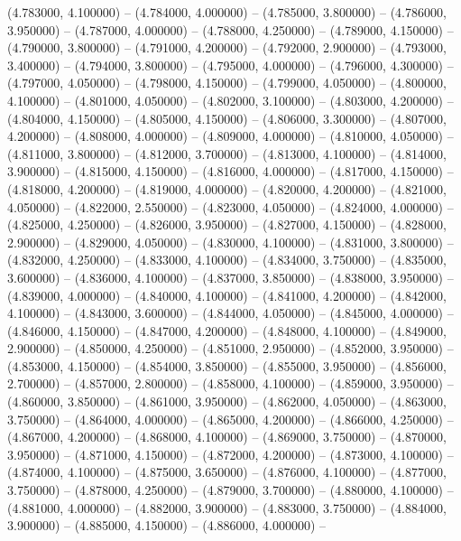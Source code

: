 (4.783000, 4.100000) -- 
(4.784000, 4.000000) -- 
(4.785000, 3.800000) -- 
(4.786000, 3.950000) -- 
(4.787000, 4.000000) -- 
(4.788000, 4.250000) -- 
(4.789000, 4.150000) -- 
(4.790000, 3.800000) -- 
(4.791000, 4.200000) -- 
(4.792000, 2.900000) -- 
(4.793000, 3.400000) -- 
(4.794000, 3.800000) -- 
(4.795000, 4.000000) -- 
(4.796000, 4.300000) -- 
(4.797000, 4.050000) -- 
(4.798000, 4.150000) -- 
(4.799000, 4.050000) -- 
(4.800000, 4.100000) -- 
(4.801000, 4.050000) -- 
(4.802000, 3.100000) -- 
(4.803000, 4.200000) -- 
(4.804000, 4.150000) -- 
(4.805000, 4.150000) -- 
(4.806000, 3.300000) -- 
(4.807000, 4.200000) -- 
(4.808000, 4.000000) -- 
(4.809000, 4.000000) -- 
(4.810000, 4.050000) -- 
(4.811000, 3.800000) -- 
(4.812000, 3.700000) -- 
(4.813000, 4.100000) -- 
(4.814000, 3.900000) -- 
(4.815000, 4.150000) -- 
(4.816000, 4.000000) -- 
(4.817000, 4.150000) -- 
(4.818000, 4.200000) -- 
(4.819000, 4.000000) -- 
(4.820000, 4.200000) -- 
(4.821000, 4.050000) -- 
(4.822000, 2.550000) -- 
(4.823000, 4.050000) -- 
(4.824000, 4.000000) -- 
(4.825000, 4.250000) -- 
(4.826000, 3.950000) -- 
(4.827000, 4.150000) -- 
(4.828000, 2.900000) -- 
(4.829000, 4.050000) -- 
(4.830000, 4.100000) -- 
(4.831000, 3.800000) -- 
(4.832000, 4.250000) -- 
(4.833000, 4.100000) -- 
(4.834000, 3.750000) -- 
(4.835000, 3.600000) -- 
(4.836000, 4.100000) -- 
(4.837000, 3.850000) -- 
(4.838000, 3.950000) -- 
(4.839000, 4.000000) -- 
(4.840000, 4.100000) -- 
(4.841000, 4.200000) -- 
(4.842000, 4.100000) -- 
(4.843000, 3.600000) -- 
(4.844000, 4.050000) -- 
(4.845000, 4.000000) -- 
(4.846000, 4.150000) -- 
(4.847000, 4.200000) -- 
(4.848000, 4.100000) -- 
(4.849000, 2.900000) -- 
(4.850000, 4.250000) -- 
(4.851000, 2.950000) -- 
(4.852000, 3.950000) -- 
(4.853000, 4.150000) -- 
(4.854000, 3.850000) -- 
(4.855000, 3.950000) -- 
(4.856000, 2.700000) -- 
(4.857000, 2.800000) -- 
(4.858000, 4.100000) -- 
(4.859000, 3.950000) -- 
(4.860000, 3.850000) -- 
(4.861000, 3.950000) -- 
(4.862000, 4.050000) -- 
(4.863000, 3.750000) -- 
(4.864000, 4.000000) -- 
(4.865000, 4.200000) -- 
(4.866000, 4.250000) -- 
(4.867000, 4.200000) -- 
(4.868000, 4.100000) -- 
(4.869000, 3.750000) -- 
(4.870000, 3.950000) -- 
(4.871000, 4.150000) -- 
(4.872000, 4.200000) -- 
(4.873000, 4.100000) -- 
(4.874000, 4.100000) -- 
(4.875000, 3.650000) -- 
(4.876000, 4.100000) -- 
(4.877000, 3.750000) -- 
(4.878000, 4.250000) -- 
(4.879000, 3.700000) -- 
(4.880000, 4.100000) -- 
(4.881000, 4.000000) -- 
(4.882000, 3.900000) -- 
(4.883000, 3.750000) -- 
(4.884000, 3.900000) -- 
(4.885000, 4.150000) -- 
(4.886000, 4.000000) -- 
